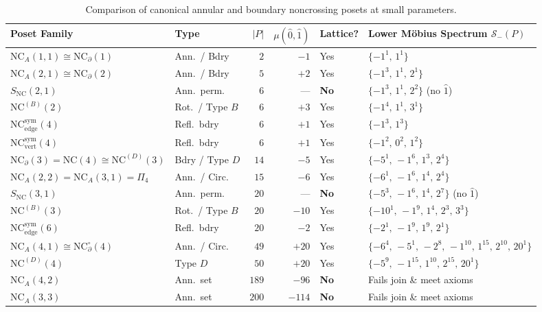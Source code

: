 \documentclass[11pt]{article}
\theoremstyle{definition}
\newcommand{\NC}{\mathrm{NC}}
\newcommand{\NCA}{\mathrm{NC}_A}
\newcommand{\SNC}{S_{\mathrm{NC}}}
\newcommand{\NCB}{\mathrm{NC}^{(B)}}
\newcommand{\NCD}{\mathrm{NC}^{(D)}}
\newcommand{\NCsym}{\mathrm{NC}^{\mathrm{sym}}}
\begin{document}
\begin{table}[t]
\centering
\footnotesize
\setlength{\tabcolsep}{4.5pt}
\caption{Comparison of canonical annular and boundary noncrossing posets at small parameters.}
\label{tab:small-orders}
\begin{tabular}{@{}llrrll@{}}
\toprule
Poset Family & Type & $|P|$ & $\mu(\hat{0},\hat{1})$ & Lattice? & Lower M\"obius Spectrum $\mathcal{S}_-(P)$ \\
\midrule
$\NCA(1,1) \cong \NC_\partial(1)$ & Ann.\ / Bdry & $2$ & $-1$ & Yes & $\{-1^1,\, 1^1\}$ \\
$\NCA(2,1) \cong \NC_\partial(2)$ & Ann.\ / Bdry & $5$ & $+2$ & Yes & $\{-1^3,\, 1^1,\, 2^1\}$ \\
$\SNC(2,1)$ & Ann.\ perm. & $6$ & --- & \textbf{No} & $\{-1^3,\, 1^1,\, 2^2\}$ (no $\hat{1}$) \\
$\NCB(2)$ & Rot.\ / Type $B$ & $6$ & $+3$ & Yes & $\{-1^4,\, 1^1,\, 3^1\}$ \\
$\NCsym_{\mathrm{edge}}(4)$ & Refl.\ bdry & $6$ & $+1$ & Yes & $\{-1^3,\, 1^3\}$ \\
$\NCsym_{\mathrm{vert}}(4)$ & Refl.\ bdry & $6$ & $+1$ & Yes & $\{-1^2,\, 0^2,\, 1^2\}$ \\
$\NC_\partial(3) = \NC(4) \cong \NCD(3)$ & Bdry / Type $D$ & $14$ & $-5$ & Yes & $\{-5^1,\, -1^6,\, 1^3,\, 2^4\}$ \\
$\NCA(2,2) = \NCA(3,1) = \Pi_4$ & Ann.\ / Circ. & $15$ & $-6$ & Yes & $\{-6^1,\, -1^6,\, 1^4,\, 2^4\}$ \\
$\SNC(3,1)$ & Ann.\ perm. & $20$ & --- & \textbf{No} & $\{-5^3,\, -1^6,\, 1^4,\, 2^7\}$ (no $\hat{1}$) \\
$\NCB(3)$ & Rot.\ / Type $B$ & $20$ & $-10$ & Yes & $\{-10^1,\, -1^9,\, 1^4,\, 2^3,\, 3^3\}$ \\
$\NCsym_{\mathrm{edge}}(6)$ & Refl.\ bdry & $20$ & $-2$ & Yes & $\{-2^1,\, -1^9,\, 1^9,\, 2^1\}$ \\
$\NCA(4,1) \cong \NC_\partial^\circ(4)$ & Ann.\ / Circ. & $49$ & $+20$ & Yes & $\{-6^4,\, -5^1,\, -2^8,\, -1^{10},\, 1^{15},\, 2^{10},\, 20^1\}$ \\
$\NCD(4)$ & Type $D$ & $50$ & $+20$ & Yes & $\{-5^9,\, -1^{15},\, 1^{10},\, 2^{15},\, 20^1\}$ \\
$\NCA(4,2)$ & Ann.\ set & $189$ & $-96$ & \textbf{No} & Fails join \& meet axioms \\
$\NCA(3,3)$ & Ann.\ set & $200$ & $-114$ & \textbf{No} & Fails join \& meet axioms \\
\bottomrule
\end{tabular}
\end{table}
\end{document}
